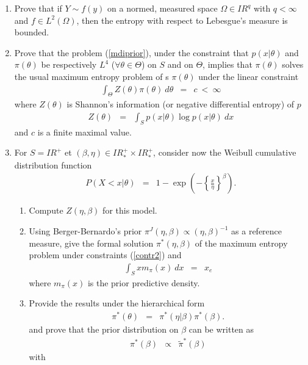\documentclass[10pt]{article}
\newcommand{\R}{I\!\!R}
\newcommand{\1}{\mathbbm{1}}
\begin{document}
\begin{enumerate}
\item Prove that if $Y\sim f(y)$ on a normed, measured space $\Omega\in\R^q$ with $q<\infty$ and $f\in L^2(\Omega)$, then the entropy with respect to Lebesgue's measure is bounded. 
\item Prove that the problem  (\ref{mdiprior}), under the constraint that  $p(x|\theta)$ and $\pi(\theta)$ be respectively $L^4$ ($\forall \theta\in\Theta$) on $S$ and on $\Theta$,  implies that  $\pi(\theta)$ solves the usual maximum entropy problem of  s $\pi(\theta)$ under the linear constraint 
\begin{eqnarray}
\int_{\Theta} Z(\theta) \pi(\theta) \ d\theta & = & c \ < \ \infty \label{contr2}
\end{eqnarray}
where $Z(\theta)$ is Shannon's information (or negative differential entropy)  of $p$ 
\begin{eqnarray*}
Z(\theta) & = & \int_{S} p(x|\theta) \log p(x|\theta) \ dx
\end{eqnarray*}
and $c$ is a finite maximal value. 
\item For $S=\R^+$ et $(\beta,\eta)\in\R^+_* \times \R^+_*$, consider now the Weibull cumulative distribution function 
\begin{eqnarray*}
P(X<x|\theta) & = & 1-\exp\left(-\left\{\frac{x}{\eta}\right\}^{\beta}\right).
\end{eqnarray*}
\begin{enumerate}
\item Compute $Z(\eta,\beta)$ for this model.
\item Using Berger-Bernardo's prior $\pi^J(\eta,\beta)\propto (\eta,\beta)^{-1}$ as a reference measure, give the formal solution  $\pi^*(\eta,\beta)$  of the maximum entropy problem under constraints  (\ref{contr2}) and
\begin{eqnarray}
\int_S x m_{\pi}(x) \ dx & = & x_e \label{cons2}
\end{eqnarray}
where $m_{\pi}(x)$ is the prior predictive density. 
\item Provide the results under the hierarchical form  
\begin{eqnarray*}
\pi^*(\theta) & = & \pi^*(\eta|\beta)\pi^*(\beta).
\end{eqnarray*}
and prove that the prior distribution on $\beta$ can be written as
\begin{eqnarray*}
\pi^*(\beta) & \propto & \tilde{\pi}^*(\beta) 
\end{eqnarray*}
with
\begin{eqnarray}

\end{eqnarray}
\end{enumerate}
\end{enumerate}
\end{document}
